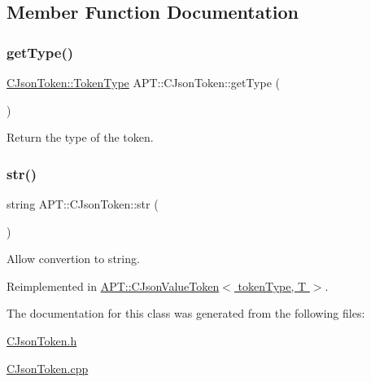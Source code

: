 \subsection{Member Function Documentation}
\mbox{\label{classAPT_1_1CJsonToken_ab06f02d48757bfc68fb041fcafd680f6}} 
\subsubsection{\texorpdfstring{get\+Type()}{getType()}}
{\footnotesize\ttfamily \hyperlink{classAPT_1_1CJsonToken_aab8edca6cac7d6c2cd4cb37ea0ab0dce}{C\+Json\+Token\+::\+Token\+Type} A\+P\+T\+::\+C\+Json\+Token\+::get\+Type (\begin{DoxyParamCaption}{ }\end{DoxyParamCaption})}

Return the type of the token. \mbox{\label{classAPT_1_1CJsonToken_a743343b64c20d0aa726d271c2b0e9be8}} 
\subsubsection{\texorpdfstring{str()}{str()}}
{\footnotesize\ttfamily string A\+P\+T\+::\+C\+Json\+Token\+::str (\begin{DoxyParamCaption}{ }\end{DoxyParamCaption})\hspace{0.3cm}{\ttfamily [virtual]}}

Allow convertion to string. 

Reimplemented in \hyperlink{classAPT_1_1CJsonValueToken_ab7d49b06f5242abfb7e67fa10278690b}{A\+P\+T\+::\+C\+Json\+Value\+Token$<$ token\+Type, T $>$}.



The documentation for this class was generated from the following files\+:\begin{DoxyCompactItemize}
\item 
\hyperlink{CJsonToken_8h}{C\+Json\+Token.\+h}\item 
\hyperlink{CJsonToken_8cpp}{C\+Json\+Token.\+cpp}\end{DoxyCompactItemize}
